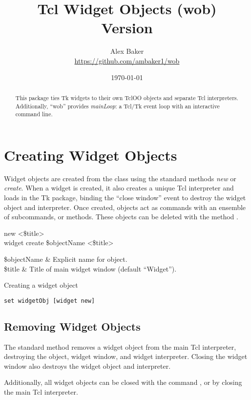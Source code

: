 \documentclass{article}
\title{\Huge Tcl Widget Objects (wob)\\\small Version \version}
\author{Alex Baker\\\small\url{https://github.com/ambaker1/wob}}
\date{\small\today}
\renewcommand{\^}[1]{\textsuperscript{#1}}
\renewcommand{\_}[1]{\textsubscript{#1}}
\begin{document}
\maketitle
\begin{abstract}
\begin{center}
This package ties Tk widgets to their own TclOO objects and separate Tcl interpreters. Additionally, ``wob'' provides \textit{mainLoop}: a Tcl/Tk event loop with an interactive command line.
\end{center}
\end{abstract}

\clearpage
\section{Creating Widget Objects}
Widget objects are created from the  class using the standard methods \textit{new} or \textit{create}. 
When a widget is created, it also creates a unique Tcl interpreter and loads in the Tk package, binding the ``close window'' event to destroy the widget object and interpreter.
Once created,  objects act as commands with an ensemble of subcommands, or methods. 
These objects can be deleted with the method .
\begin{syntax}
   	 new <\$title> \\
   	widget create \$objectName <\$title>
\end{syntax}
\begin{args}
   	\$objectName & Explicit name for object. \\
   	\$title & Title of main widget window (default ``Widget'').
\end{args}
\begin{example}{Creating a widget object}
\begin{lstlisting}
set widgetObj [widget new]
\end{lstlisting}
\end{example}
\subsection{Removing Widget Objects}
The standard method  removes a widget object from the main Tcl interpreter, destroying the object, widget window, and widget interpreter. 
Closing the widget window also destroys the widget object and interpreter.

\begin{syntax}
\end{syntax}
Additionally, all widget objects can be closed with the command , or by closing the main Tcl interpreter.
\begin{syntax}
\end{syntax}
\end{document}
